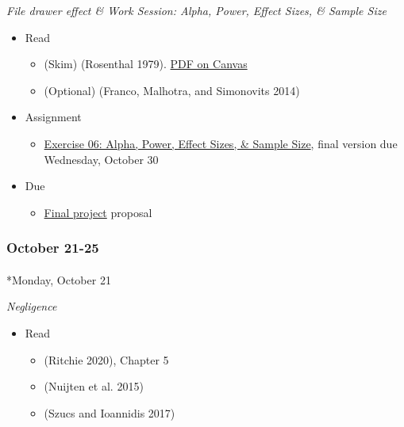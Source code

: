 \documentclass[
  letterpaper,
  DIV=11,
  numbers=noendperiod]{scrartcl}
\makeatletter
\let\oldparagraph\paragraph
\renewcommand{\paragraph}{
    \@ifstar
      \xxxParagraphStar
      \xxxParagraphNoStar
  }
\newcommand{\xxxParagraphStar}[1]{\oldparagraph*{#1}\mbox{}}
\newcommand{\xxxParagraphNoStar}[1]{\oldparagraph{#1}\mbox{}}
\providecommand{\tightlist}{%
  \setlength{\itemsep}{0pt}\setlength{\parskip}{0pt}}\usepackage{longtable,booktabs,array}
\makeatother
\begin{document}
\emph{File drawer effect \& Work Session: Alpha, Power, Effect Sizes, \&
Sample Size}

\begin{itemize}
\tightlist
\item
  Read

  \begin{itemize}
  \tightlist
  \item
    (Skim) (Rosenthal 1979).
    \href{https://psu.instructure.com/courses/2350148/files/folder/readings?preview=165170719}{PDF
    on Canvas}
  \item
    (Optional) (Franco, Malhotra, and Simonovits 2014)
  \end{itemize}
\item
  {Assignment}

  \begin{itemize}
  \tightlist
  \item
    \href{exercises/ex06-apes.qmd}{Exercise 06: Alpha, Power, Effect
    Sizes, \& Sample Size}, {final version due Wednesday, October 30}
  \end{itemize}
\item
  {Due}

  \begin{itemize}
  \tightlist
  \item
    \href{exercises/final-project.qmd}{Final project} proposal
  \end{itemize}
\end{itemize}

\subsubsection*{October 21-25}\label{week-09}

\paragraph*{Monday, October 21}\label{monday-october-21}

\emph{Negligence}

\begin{itemize}
\tightlist
\item
  Read

  \begin{itemize}
  \tightlist
  \item
    (Ritchie 2020), Chapter 5
  \item
    (Nuijten et al. 2015)
  \item
    (Szucs and Ioannidis 2017)
  \end{itemize}
\end{itemize}
\end{document}
